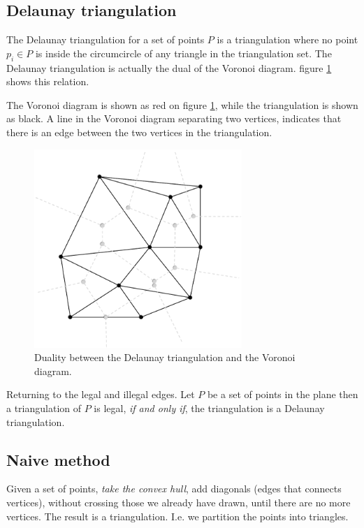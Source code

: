 \documentclass[10pt]{article}
\begin{document}
\subsection{Delaunay triangulation} %
\label{sub:delaunay_triangulation}
The Delaunay triangulation for a set of points $P$ is a triangulation where no point $p_i \in P$ is inside the circumcircle of any triangle in the triangulation set. The Delaunay triangulation is actually the dual of the Voronoi diagram. figure \ref{fig8} shows this relation. 

The Voronoi diagram is shown as red on figure \ref{fig8}, while the triangulation is shown as black. A line in the Voronoi diagram separating two vertices, indicates that there is an edge between the two vertices in the triangulation.

\begin{figure}[ht]
\centering
\includegraphics[width=0.7\textwidth]{figures/fig8.pdf}
\caption{Duality between the Delaunay triangulation and the Voronoi diagram.}
\label{fig8}
\end{figure}

Returning to the legal and illegal edges. Let $P$ be a set of points in the plane then a triangulation of $P$ is legal, \emph{if and only if}, the triangulation is a Delaunay triangulation.


\subsection{Naive method} %
\label{sub:naive_method}
Given a set of points, \emph{take the convex hull}, add diagonals (edges that connects vertices), without crossing those we already have drawn, until there are no more vertices. The result is a triangulation. I.e. we partition the points into triangles.
\end{document}
